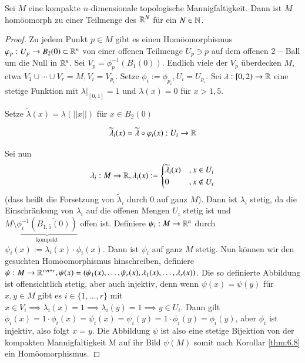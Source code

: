 \documentclass[a4paper,10pt]{scrartcl}
\begin{document}
\begin{st}
 Sei $M$ eine kompakte $n$-dimensionale topologische Mannigfaltigkeit. Dann ist $M$ homöomorph zu einer Teilmenge des $\mathbb{R}^N$ für ein $N\in \mathbb{N}$.
\end{st}
\begin{figure}[H]
\centering
 \fixme[fig36]
\caption{}
\end{figure}
\begin{proof}
 Zu jedem Punkt $p\in M$ gibt es einen Homöomorphismus $\varphi_p: U_p\to B_2(0) \subset \mathbb{R}^n$ von einer offenen Teilmenge $U_p\ni p$ auf dem offenen $2-$Ball um die Null in $\mathbb{R}^n$. Sei $V_p=\phi_p^{-1}(B_1(0))$. Endlich viele der $V_p$ überdecken $M$, etwa $V_1 \cup \dotsb \cup V_r=M, V_i=V_{p_i}$. Setze $\phi_i:=\phi_{p_i}, U_i=U_{p_i}$. Sei $\lambda:[0,2)\to \mathbb{R}$ eine stetige Funktion mit $\lambda|_{[0,1]}=1$ und $\lambda(x)=0$ für $x>1,5$.
\begin{figure}[H]
\centering
 \fixme[fig37]
\caption{}
\end{figure}
Setze $\tilde \lambda(x)=\lambda(||x||)$ für $x\in B_2(0)$\\
\begin{figure}[H]
\centering
 \fixme[fig38]
\caption{}
\end{figure}
\[
 \widetilde \lambda_i(x)=\widetilde\lambda \circ \varphi_i(x): U_i\to \mathbb{R}
\]
\begin{figure}[H]
\centering
 \fixme[fig39]
\caption{}
\end{figure}
Sei nun 
\[
 \lambda_i: M \to \mathbb{R}, \lambda_i(x):=\begin{cases} \widetilde \lambda_i(x)&, x\in U_i\\ 0 &,x \notin U_i \end{cases}
\]
(dass heißt die Forsetzung von $\tilde\lambda_i$ durch $0$ auf ganz $M$). Dann ist $\lambda_i$ stetig, da die Einschränkung von $\lambda_i$ auf die offenen Mengen $U_i$ stetig ist und $M\setminus \underbrace{\phi_i^{-1}(\overline{B_{1,5}(0)})}_{\text{kompakt}}$ offen ist. Definiere $\psi_i: M\to \mathbb{R}^n$ durch $\psi_i(x):= \lambda_i(x)\cdot \phi_i(x)$. Dann ist $\psi_i$ auf ganz $M$ stetig.  Nun können wir den gesuchten Homöomorphismus hinschreiben, definiere $\psi: M\to \mathbb{R}^{r\cdot n+r} , \psi(x)=(\psi_1(x),\dotsc  , \psi_r(x), \lambda_1(x),\dotsc  , \lambda_r(x))$. Die so definierte Abbildung ist offensichtlich stetig, aber auch injektiv, denn wenn $\psi(x)=\psi(y)$ für $x,y\in M$ gibt es $i\in \{1,\dotsc  , r\}$ mit $x\in V_i \implies \lambda_i(x)=1 \implies \lambda_i(y)=1 \implies y \in U_i$. Dann gilt $\phi_i(x)=1\cdot \phi_i(x)=\psi_i(x)=\psi_i(y)=1\cdot \phi_i(y)= \phi_i(y)$, aber $\phi_i$ ist injektiv, also folgt $x=y$. Die Abbildung $\psi$ ist also eine stetige Bijektion von der kompakten Mannigfaltigkeit M auf ihr Bild $\psi(M)$ somit nach Korollar \ref{thm:6.8} ein Homöomorphismus.
\end{proof}
\end{document}
